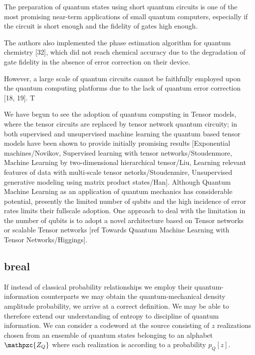 \documentclass[7pt]{article}
\begin{document}
The preparation of quantum states using short quantum circuits is one of the most promising near-term applications of small quantum computers, especially if the circuit is short enough and the fidelity of gates high enough.

The authors also implemented the phase estimation algorithm for quantum chemistry [32], which did not reach chemical accuracy due to the degradation of gate fidelity in the absence of error correction on their device.

However, a large scale of
quantum circuits cannot be faithfully employed upon the quantum computing platforms due to the lack of quantum
error correction [18, 19]. T

We have begun to see the adoption of quantum computing in Tensor models, where the tensor circuits are replaced by tensor network quantum circuity; in both supervised and unsupervised machine learning the quantum based tensor models have been shown to provide initially promising results [Exponential machines/Novikov, Supervised learning with tensor networks/Stoudenmore, Machine Learning by two-dimensional hierarchical tensor/Liu, Learning relevant features of data with multi-scale tensor netorks/Stoudenmire, Unsupervised generative modeling using matrix product states/Han]. Although Quantum Machine Learning as an application of quantum mechanics  has considerable potential, presently the limited number of qubits and the high incidence of error rates limits their fullscale adoption. One approach to deal with the limitation in the number of qubits is to adopt a novel architecture based on Tensor networks or scalable Tensor networks [ref Towards Quantum Machine Learning with Tensor Networks/Higgings].


\subsection{breal}
If instead of classical probability relationships we employ their quantum-information counterparts we may obtain the quantum-mechanical density amplitude probability, we arrive at a correct definition. We may be able to therefore extend our understanding of entropy to discipline of quantum information. We can consider a codeword at the source consisting of $z$ realizations chosen from an ensemble of quantum states belonging to an alphabet $\mathpzc{Z_Q}$ where each realization is according to a probability $p_Q[z]$.
	



\end{document}
